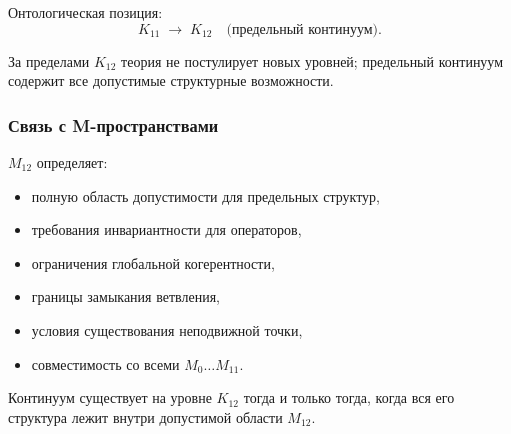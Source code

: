 Онтологическая позиция:
\[
K_{11} \;\longrightarrow\; K_{12} \quad \text{(предельный континуум)}.
\]

За пределами $K_{12}$ теория не постулирует новых уровней; предельный
континуум содержит все допустимые структурные возможности.

\subsubsection{Связь с M-пространствами}

$M_{12}$ определяет:
\begin{itemize}
    \item полную область допустимости для предельных структур,
    \item требования инвариантности для операторов,
    \item ограничения глобальной когерентности,
    \item границы замыкания ветвления,
    \item условия существования неподвижной точки,
    \item совместимость со всеми $M_0\dots M_{11}$.
\end{itemize}

Континуум существует на уровне $K_{12}$ тогда и только тогда, когда вся его
структура лежит внутри допустимой области $M_{12}$.
